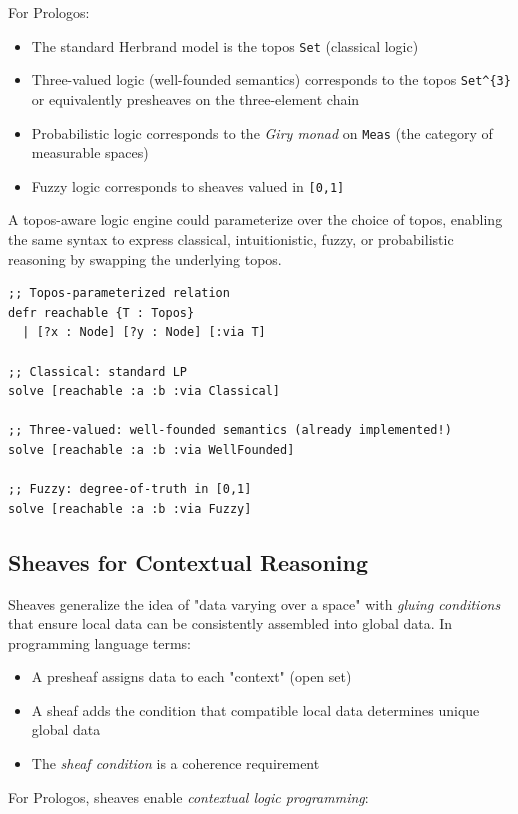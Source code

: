 \documentclass[11pt]{article}
\begin{document}
For Prologos:
\begin{itemize}
\item The standard Herbrand model is the topos \texttt{Set} (classical logic)
\item Three-valued logic (well-founded semantics) corresponds to the topos
\texttt{Set\textasciicircum{}\{3\}} or equivalently presheaves on the three-element chain
\item Probabilistic logic corresponds to the \emph{Giry monad} on \texttt{Meas} (the category
of measurable spaces)
\item Fuzzy logic corresponds to sheaves valued in \texttt{[0,1]}
\end{itemize}

A topos-aware logic engine could parameterize over the choice of topos, enabling
the same syntax to express classical, intuitionistic, fuzzy, or probabilistic
reasoning by swapping the underlying topos.

\begin{verbatim}
;; Topos-parameterized relation
defr reachable {T : Topos}
  | [?x : Node] [?y : Node] [:via T]

;; Classical: standard LP
solve [reachable :a :b :via Classical]

;; Three-valued: well-founded semantics (already implemented!)
solve [reachable :a :b :via WellFounded]

;; Fuzzy: degree-of-truth in [0,1]
solve [reachable :a :b :via Fuzzy]
\end{verbatim}
\subsection{Sheaves for Contextual Reasoning}
\label{sec:org130c981}

Sheaves generalize the idea of "data varying over a space" with \emph{gluing
conditions} that ensure local data can be consistently assembled into
global data. In programming language terms:

\begin{itemize}
\item A presheaf assigns data to each "context" (open set)
\item A sheaf adds the condition that compatible local data determines unique global data
\item The \emph{sheaf condition} is a coherence requirement
\end{itemize}

For Prologos, sheaves enable \emph{contextual logic programming}:
\end{document}

